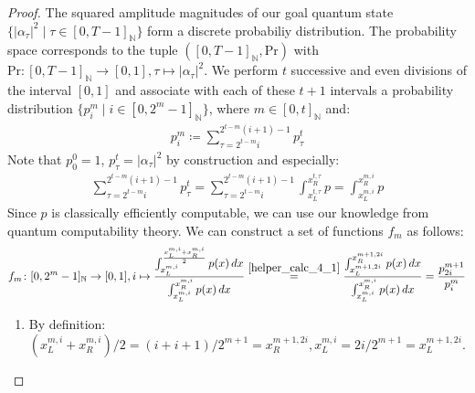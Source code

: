 \begin{proof}
    The squared amplitude magnitudes of our goal quantum state \(\{|\alpha_\tau|^2 \mid \tau \in [0, T-1]_{\mathbb{N}}\}\) form a discrete probabiliy distribution. The probability space corresponds to the tuple \(([0, T-1]_{\mathbb{N}}, \text{Pr})\) with \(\text{Pr}\colon [0, T-1]_{\mathbb{N}} \to [0, 1], \tau \mapsto |\alpha_{\tau}|^2\). We perform \(t\) successive and even divisions of the interval \([0, 1]\) and associate with each of these \(t+1\) intervals a probability distribution \(\{p_i^m \mid i \in [0, 2^m-1]_{\mathbb{N}}\}\), where \(m \in [0, t]_{\mathbb{N}}\) and:
    \begin{align}
        p_i^m \coloneqq \sum_{\tau = 2^{t-m}i}^{2^{t-m}(i+1)-1} p^t_\tau
    \end{align}
    Note that \(p_0^0 = 1\), \(p_\tau^t = |\alpha_\tau|^2\) by construction and especially:
    \begin{align}
        \sum_{\tau = 2^{t-m}i}^{2^{t-m}(i+1)-1} p^t_\tau = \sum_{\tau = 2^{t-m}i}^{2^{t-m}(i+1)-1} \int_{x_L^{t, \tau}}^{x_R^{t, \tau}} p = \int_{x_L^{m, i}}^{x_R^{m, i}} p
    \end{align}
    Since \(p\) is classically efficiently computable, we can use our knowledge from quantum computability theory. We can construct a set of functions \(f_m\) as follows:
    \begin{align}
        f_m \colon [0, 2^m-1]_{\mathbb{N}} \to [0, 1], i \mapsto \frac{\int_{x_L^{m, i}}^{\frac{x_L^{m, i}+x_R^{m, i}}{2}} p(x) \, dx}{\int_{x_L^{m, i}}^{x_R^{m, i}} p(x) \, dx} \overset{\ref{helper_calc_4_1}}{=} \frac{\int_{x_L^{m+1, 2i}}^{x_R^{m+1, 2i}} p(x) \, dx}{\int_{x_L^{m, i}}^{x_R^{m, i}} p(x) \, dx} = \frac{p_{2i}^{m+1}}{p_i^m}
    \end{align}
    \begin{enumerate}[label=(\arabic*)]
        \item \label{helper_calc_4_1} By definition: \((x_L^{m, i}+x_R^{m, i})/2 = (i+i+1)/2^{m+1} = x_R^{m+1, 2i}, x_L^{m, i} = 2i/2^{m+1} = x_L^{m+1, 2i}\).
    \end{enumerate}
    

\end{proof}
